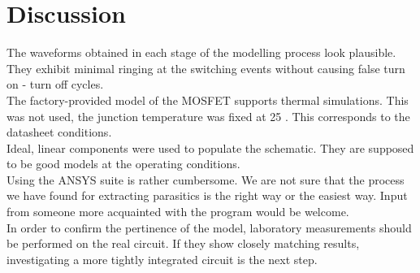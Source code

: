 \section{Discussion}
\label{sec:discussion}

The waveforms obtained in each stage of the modelling process look plausible. They exhibit minimal ringing at the switching events without causing false turn on - turn off cycles. \\

The factory-provided model of the MOSFET supports thermal simulations. This was not used, the junction temperature was fixed at 25 \textcelsius. This corresponds to the datasheet conditions. \\

Ideal, linear components were used to populate the schematic. They are supposed to be good models at the operating conditions. \\

Using the ANSYS suite is rather cumbersome. We are not sure that the process we have found for extracting parasitics is the right way or the easiest way. Input from someone more acquainted with the program would be welcome. \\

In order to confirm the pertinence of the model, laboratory measurements should be performed on the real circuit. If they show closely matching results, investigating a more tightly integrated circuit is the next step.
